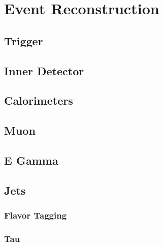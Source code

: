 \chapter{Event Reconstruction}

\section{Trigger}{
	
}

\section{Inner Detector}{
	
}

\section{Calorimeters}{
	
}

\section{Muon}{
	
}

\section{E Gamma}{
	
}

\section{Jets}{
	
}

	\subsection{Flavor Tagging}{

	}

	\subsection{Tau}{

	}

\section{\Etm}{
	
}
	